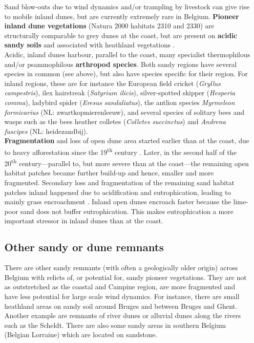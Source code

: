 \documentclass[10pt, twoside]{book} %
\begin{document}
	Sand blow-outs due to wind dynamics and/or trampling by livestock can give rise to mobile inland dunes, but are currently extremely rare in Belgium. \textbf{Pioneer inland dune vegetations} (Natura 2000 habitats 2310 and 2330) are structurally comparable to grey dunes at the coast, but are present on \textbf{acidic sandy soils} and associated with heathland vegetations \citep{decleer2007}.\\
	
	Acidic, inland dunes harbour, parallel to the coast, many specialist thermophilous and/or psammophilous \textbf{arthropod species}. Both sandy regions have several species in common (see above), but also have species specific for their region. For inland regions, these are for instance the European field cricket (\textit{Gryllus campestris}), ilex hairstreak (\textit{Satyrium ilicis}), silver-spotted skipper (\textit{Hesperia comma}), ladybird spider (\textit{Eresus sandaliatus}), the antlion species \textit{Myrmeleon formicarius} (NL: zwartkopmierenleeuw), and several species of solitary bees and wasps such as the bees heather colletes (\textit{Colletes succinctus}) and \textit{Andrena fuscipes} (NL: heidezandbij).\\
	
	\textbf{Fragmentation} and loss of open dune area started earlier than at the coast, due to heavy afforestation since the 19\textsuperscript{th} century \citep{dekeersmaeker2015}. Later, in the second half of the 20\textsuperscript{th} century---parallel to, but more severe than at the coast---the remaining open habitat patches became further build-up and hence, smaller and more fragmented. Secondary loss and fragmentation of the remaining sand habitat patches inland happened due to acidification and eutrophication, leading to mainly grass encroachment \citep{schneiders2020}. Inland open dunes encroach faster because the lime-poor sand does not buffer eutrophication. This makes eutrophication a more important stressor in inland dunes than at the coast.\\
	
	\subsection{Other sandy or dune remnants}
	There are other sandy remnants (with often a geologically older origin) across Belgium with relicts of, or potential for, sandy pioneer vegetations. They are not as outstretched as the coastal and Campine region, are more fragmented and have less potential for large scale wind dynamics. For instance, there are small heathland areas on sandy soil around Bruges and between Bruges and Ghent. Another example are remnants of river dunes or alluvial dunes along the rivers such as the Scheldt. There are also some sandy areas in southern Belgium (Belgian Lorraine) which are located on sandstone.\\
	\clearpage
	
\end{document}
